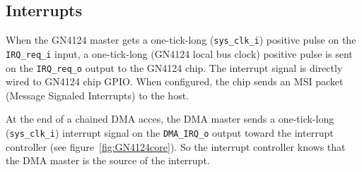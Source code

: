 \documentclass[10pt,a4paper]{cerndoc}
\begin{document}
   \subsection{Interrupts}
   When the GN4124 master gets a one-tick-long (\verb+sys_clk_i+) positive pulse on the \verb+IRQ_req_i+ input, a one-tick-long (GN4124 local bus clock) positive pulse is sent on the \verb+IRQ_req_o+ output to the GN4124 chip. The interrupt signal is directly wired to GN4124 chip GPIO. When configured, the chip sends an MSI packet (Message Signaled Interrupts) to the host.
   
   At the end of a chained DMA acces, the DMA master sends a one-tick-long (\verb+sys_clk_i+) interrupt signal on the \verb+DMA_IRQ_o+ output toward the interrupt controller (see figure~\ref{fig:GN4124core}). So the interrupt controller knows that the DMA master is the source of the interrupt.
\end{document}
